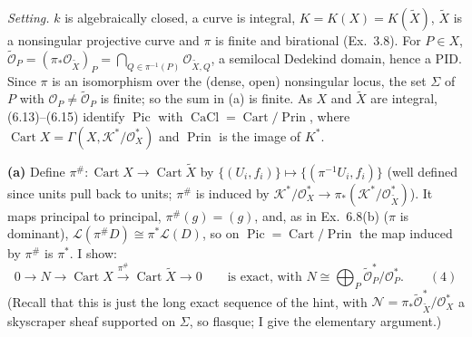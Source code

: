 \documentclass[11pt]{article}
\begin{document}
\pf
\emph{Setting.} $k$ is algebraically closed, a curve is integral, $K=K(X)=K(\tilde X)$, $\tilde X$ is a nonsingular projective curve and $\pi$ is finite and birational (Ex.~3.8). For $P\in X$, $\tilde{\mathcal O}_P=(\pi_*\mathcal O_{\tilde X})_P=\bigcap_{Q\in\pi^{-1}(P)}\mathcal O_{\tilde X,Q}$, a semilocal Dedekind domain, hence a PID. Since $\pi$ is an isomorphism over the (dense, open) nonsingular locus, the set $\Sigma$ of $P$ with $\mathcal O_P\ne\tilde{\mathcal O}_P$ is finite; so the sum in (a) is finite. As $X$ and $\tilde X$ are integral, (6.13)--(6.15) identify $\operatorname{Pic}$ with $\operatorname{CaCl}=\operatorname{Cart}/\operatorname{Prin}$, where $\operatorname{Cart}X=\Gamma(X,\mathcal K^*/\mathcal O_X^*)$ and $\operatorname{Prin}$ is the image of $K^*$.

\textbf{(a)} Define $\pi^\#:\operatorname{Cart}X\to\operatorname{Cart}\tilde X$ by $\{(U_i,f_i)\}\mapsto\{(\pi^{-1}U_i,f_i)\}$ (well defined since units pull back to units; $\pi^\#$ is induced by $\mathcal K^*/\mathcal O_X^*\to\pi_*(\mathcal K^*/\mathcal O_{\tilde X}^*)$). It maps principal to principal, $\pi^\#(g)=(g)$, and, as in Ex.~6.8(b) ($\pi$ is dominant), $\mathcal L(\pi^\#D)\cong\pi^*\mathcal L(D)$, so on $\operatorname{Pic}=\operatorname{Cart}/\operatorname{Prin}$ the map induced by $\pi^\#$ is $\pi^*$. I show:
\[0\to N\to\operatorname{Cart}X\xrightarrow{\pi^\#}\operatorname{Cart}\tilde X\to0\qquad\text{is exact, with }N\cong\bigoplus_P\tilde{\mathcal O}_P^*/\mathcal O_P^*.\qquad(4)\]
(Recall that this is just the long exact sequence of the hint, with $\mathcal N=\pi_*\tilde{\mathcal O}^*_{\tilde X}/\mathcal O_X^*$ a skyscraper sheaf supported on $\Sigma$, so flasque; I give the elementary argument.)
\end{document}
